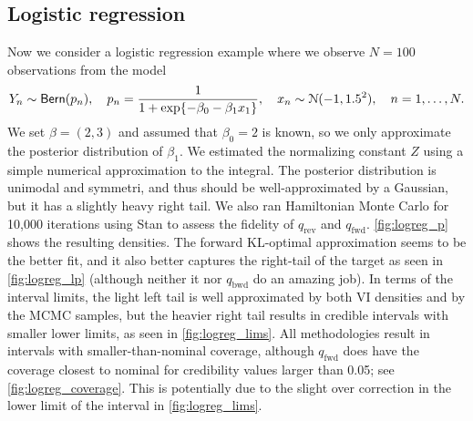 \subsection{Logistic regression} \label{subsec:logreg}


Now we consider a logistic regression example where
we observe $N=100$ observations from the model
\[
  Y_n\sim{\sf{Bern}}(p_n),\quad
  p_n=\frac{1}{1+\exp\{-\beta_0-\beta_1 x_1\}},\quad
  x_n\sim\mathcal{N}(-1,1.5^2),\quad
  n=1,\dots,N.
\]
We set $\beta=(2,3)$ and assumed that $\beta_0=2$ is known,
so we only approximate the posterior distribution of $\beta_1$.
We estimated the normalizing constant $Z$ using
a simple numerical approximation to the integral.
The posterior distribution is unimodal and symmetri,
and thus should be well-approximated by a Gaussian,
but it has a slightly heavy right tail.
We also ran Hamiltonian Monte Carlo for 10,000 iterations
using Stan to assess the fidelity of
$q_\mathrm{rev}$ and $q_\mathrm{fwd}$.
\cref{fig:logreg_p} shows the resulting densities.
The forward KL-optimal approximation seems to be the better fit,
and it also better captures the right-tail of the target
as seen in \cref{fig:logreg_lp}
(although neither it nor $q_\mathrm{bwd}$ do an amazing job).
In terms of the interval limits,
the light left tail is well approximated by both VI densities
and by the MCMC samples,
but the heavier right tail results in
credible intervals with smaller lower limits,
as seen in \cref{fig:logreg_lims}.
All methodologies result in intervals with smaller-than-nominal coverage,
although $q_\mathrm{fwd}$ does have the coverage closest to nominal
for credibility values larger than 0.05; see \cref{fig:logreg_coverage}.
This is potentially due to the slight over correction
in the lower limit of the interval in \cref{fig:logreg_lims}.


